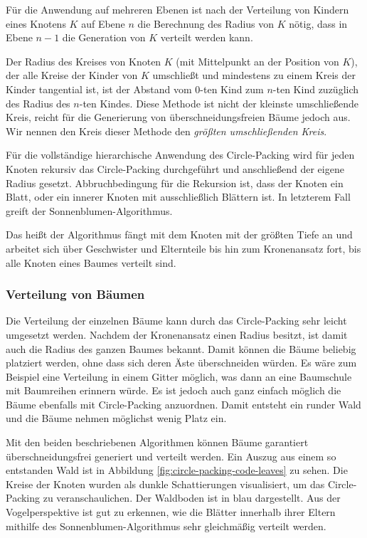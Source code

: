 Für die Anwendung auf mehreren Ebenen ist nach der Verteilung von Kindern eines Knotens $K$ auf Ebene $n$ die Berechnung des Radius von $K$ nötig, dass in Ebene $n - 1$ die Generation von $K$ verteilt werden kann.

Der Radius des Kreises von Knoten $K$ (mit Mittelpunkt an der Position von $K$), der alle Kreise der Kinder von $K$ umschließt und mindestens zu einem Kreis der Kinder tangential ist, ist der Abstand vom $0$-ten Kind zum $n$-ten Kind zuzüglich des Radius des $n$-ten Kindes. Diese Methode ist nicht der kleinste umschließende Kreis, reicht für die Generierung von überschneidungsfreien Bäume jedoch aus. Wir nennen den Kreis dieser Methode den \textit{größten umschließenden Kreis}.

Für die vollständige hierarchische Anwendung des Circle-Packing wird für jeden Knoten rekursiv das Circle-Packing durchgeführt und anschließend der eigene Radius gesetzt. Abbruchbedingung für die Rekursion ist, dass der Knoten ein Blatt, oder ein innerer Knoten mit ausschließlich Blättern ist. In letzterem Fall greift der Sonnenblumen-Algorithmus.

Das heißt der Algorithmus fängt mit dem Knoten mit der größten Tiefe an und arbeitet sich über Geschwister und Elternteile bis hin zum Kronenansatz fort, bis alle Knoten eines Baumes verteilt sind.

\subsubsection*{Verteilung von Bäumen}

Die Verteilung der einzelnen Bäume kann durch das Circle-Packing sehr leicht umgesetzt werden. Nachdem der Kronenansatz einen Radius besitzt, ist damit auch die Radius des ganzen Baumes bekannt. Damit können die Bäume beliebig platziert werden, ohne dass sich deren Äste überschneiden würden. Es wäre zum Beispiel eine Verteilung in einem Gitter möglich, was dann an eine Baumschule mit Baumreihen erinnern würde. Es ist jedoch auch ganz einfach möglich die Bäume ebenfalls mit Circle-Packing anzuordnen. Damit entsteht ein runder Wald und die Bäume nehmen möglichst wenig Platz ein.

Mit den beiden beschriebenen Algorithmen können Bäume garantiert überschneidungsfrei generiert und verteilt werden. Ein Auszug aus einem so entstanden Wald ist in Abbildung \ref{fig:circle-packing-code-leaves} zu sehen. Die Kreise der Knoten wurden als dunkle Schattierungen visualisiert, um das Circle-Packing zu veranschaulichen. Der Waldboden ist in blau dargestellt. Aus der Vogelperspektive ist gut zu erkennen, wie die Blätter innerhalb ihrer Eltern mithilfe des Sonnenblumen-Algorithmus sehr gleichmäßig verteilt werden.

